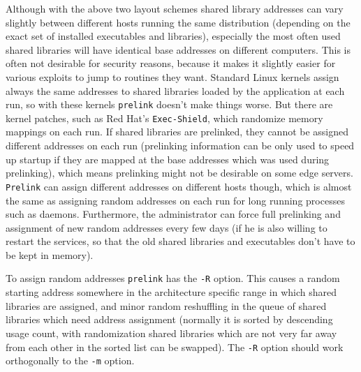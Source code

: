 \documentclass[twoside]{article}
\def\tts#1{\texttt{\small #1}}
\begin{document}
Although with the above two layout schemes shared library addresses can
vary slightly between different hosts running the same distribution
(depending on the exact set of installed executables and libraries), especially
the most often used shared libraries will have identical base addresses
on different computers.  This is often not desirable for security reasons,
because it makes it slightly easier for various exploits to jump to routines
they want.  Standard Linux kernels assign always the same addresses to
shared libraries loaded by the application at each run, so with these
kernels \tts{prelink} doesn't make things worse.  But there are kernel
patches, such as Red Hat's \tts{Exec-Shield}, which randomize memory
mappings on each run.  If shared libraries are prelinked, they cannot
be assigned different addresses on each run (prelinking information can
be only used to speed up startup if they are mapped at the base addresses
which was used during prelinking), which
means prelinking might not be desirable on some edge servers.
\tts{Prelink} can assign different addresses on different hosts though,
which is almost the same as assigning random addresses on each run
for long running processes such as daemons.  Furthermore, the administrator
can force full prelinking and assignment of new random addresses every few
days (if he is also willing to restart the services, so that the old
shared libraries and executables don't have to be kept in memory).

To assign random addresses \tts{prelink} has the \tts{-R} option.
This causes a random starting address somewhere in the architecture specific
range in which shared libraries are assigned, and minor random reshuffling
in the queue of shared libraries which need address assignment (normally
it is sorted by descending usage count, with randomization shared libraries
which are not very far away from each other in the sorted list can be
swapped).  The \tts{-R} option should work orthogonally to the \tts{-m}
option.
\end{document}
